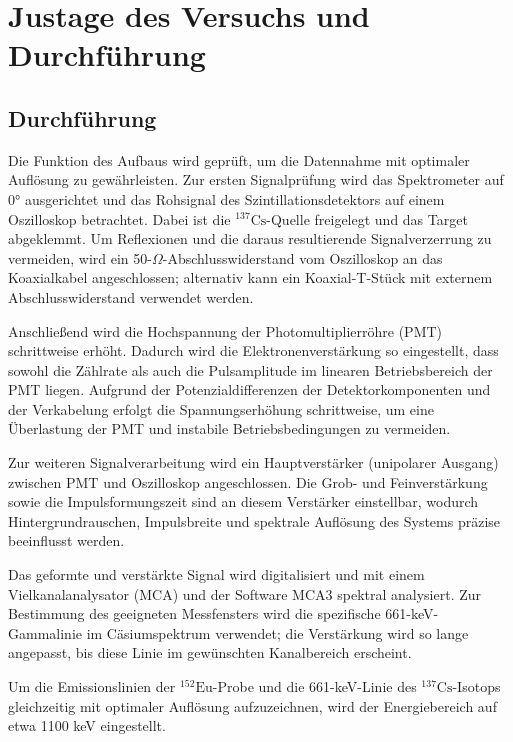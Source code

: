 \section{Justage des Versuchs und Durchführung}
\subsection{Durchführung}
Die Funktion des Aufbaus wird geprüft, um die Datennahme mit optimaler Auflösung zu gewährleisten. 
Zur ersten Signalprüfung wird das Spektrometer auf 0° ausgerichtet und das Rohsignal des Szintillationsdetektors auf einem Oszilloskop betrachtet. 
Dabei ist die $^{137}\text{Cs}$-Quelle freigelegt und das Target abgeklemmt. 
Um Reflexionen und die daraus resultierende Signalverzerrung zu vermeiden, wird ein 50-$\Omega$-Abschlusswiderstand vom Oszilloskop an das Koaxialkabel angeschlossen; alternativ kann ein Koaxial-T-Stück mit externem Abschlusswiderstand verwendet werden.

Anschließend wird die Hochspannung der Photomultiplierröhre (PMT) schrittweise erhöht. 
Dadurch wird die Elektronenverstärkung so eingestellt, dass sowohl die Zählrate als auch die Pulsamplitude im linearen Betriebsbereich der PMT liegen.  
Aufgrund der Potenzialdifferenzen der Detektorkomponenten und der Verkabelung erfolgt die Spannungserhöhung schrittweise, um eine Überlastung der PMT und instabile Betriebsbedingungen zu vermeiden.

Zur weiteren Signalverarbeitung wird ein Hauptverstärker (unipolarer Ausgang) zwischen PMT und Oszilloskop angeschlossen. 
Die Grob- und Feinverstärkung sowie die Impulsformungszeit sind an diesem Verstärker einstellbar, wodurch Hintergrundrauschen, Impulsbreite und spektrale Auflösung des Systems präzise beeinflusst werden.

Das geformte und verstärkte Signal wird digitalisiert und mit einem Vielkanalanalysator (MCA) und der Software MCA3 spektral analysiert. 
Zur Bestimmung des geeigneten Messfensters wird die spezifische 661-keV-Gammalinie im Cäsiumspektrum verwendet; die Verstärkung wird so lange angepasst, bis diese Linie im gewünschten Kanalbereich erscheint.

Um die Emissionslinien der $^{152}\text{Eu}$-Probe und die 661-keV-Linie des $^{137}\text{Cs}$-Isotops gleichzeitig mit optimaler Auflösung aufzuzeichnen, wird der Energiebereich auf etwa 1100 keV eingestellt.

